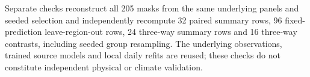 Separate checks reconstruct all 205 masks from the same underlying panels and seeded selection and independently recompute 32 paired summary rows, 96 fixed-prediction leave-region-out rows, 24 three-way summary rows and 16 three-way contrasts, including seeded group resampling. The underlying observations, trained source models and local daily refits are reused; these checks do not constitute independent physical or climate validation.
